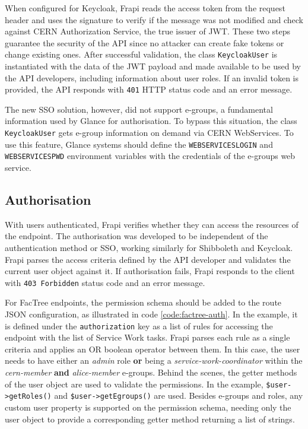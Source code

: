 
When configured for Keycloak, Frapi reads the access token from the request header and uses the signature to verify if the message was not modified and check against CERN Authorization Service, the true issuer of JWT. These two steps guarantee the security of the API since no attacker can create fake tokens or change existing ones. After successful validation, the class \texttt{KeycloakUser} is instantiated with the data of the JWT payload and made available to be used by the API developers, including information about user roles. If an invalid token is provided, the API responds with \texttt{401} HTTP status code and an error message.

The new SSO solution, however, did not support e-groups, a fundamental information used by Glance for authorisation. To bypass this situation, the class \texttt{KeycloakUser} gets e-group information on demand via CERN WebServices. To use this feature, Glance systems should define the \texttt{WEBSERVICES\textunderscore LOGIN} and \texttt{WEBSERVICES\textunderscore PWD} environment variables with the credentials of the e-groups web service.

\subsection{Authorisation}
\label{sec:frapi-v1-authorisation}

With users authenticated, Frapi verifies whether they can access the resources of the endpoint. The authorisation was developed to be independent of the authentication method or SSO, working similarly for Shibboleth and Keycloak. Frapi parses the access criteria defined by the API developer and validates the current user object against it. If authorisation fails, Frapi responds to the client with \texttt{403 Forbidden} status code and an error message.

For FacTree endpoints, the permission schema should be added to the route JSON configuration, as illustrated in code \autoref{code:factree-auth}. In the example, it is defined under the \texttt{authorization} key as a list of rules for accessing the endpoint with the list of Service Work tasks. Frapi parses each rule as a single criteria and applies an OR boolean operator between them. In this case, the user needs to have either an \textit{admin} role \textbf{or} being a \textit{service-work-coordinator} within the \textit{cern-member} \textbf{and} \textit{alice-member} e-groups. Behind the scenes, the getter methods of the user object are used to validate the permissions. In the example, \texttt{\$user->getRoles()} and \texttt{\$user->getEgroups()} are used. Besides e-groups and roles, any custom user property is supported on the permission schema, needing only the user object to provide a corresponding getter method returning a list of strings.


